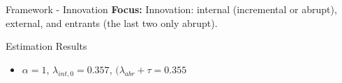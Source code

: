 \documentclass[11pt]{beamer}
\begin{document}
\begin{frame}{Framework - Innovation}
	\textbf{Focus:} Innovation: internal (incremental or abrupt), external, and entrants (the last two only abrupt).

\end{frame}

\begin{frame} {Estimation Results}
	\begin{itemize}\itemsep 12pt
		\item $\alpha = 1$, $\lambda_{int, 0}= 0.357 $, $(\lambda_{abr} + \tau = 0.355 $\\
		\begin{center}
		\begin{figure}\centering\label{Innov5}
		\end{figure}
		\end{center}
	\end{itemize}
\end{frame}
\end{document}
